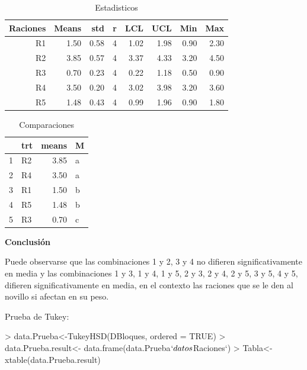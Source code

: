 \documentclass[12pt,letterpaper]{report}
\begin{document}
\begin{table}[ht]
\centering
\begin{tabular}{rrrrrrrr}
  \hline
  Raciones  & Means & std & r & LCL & UCL & Min & Max \\ 
  \hline
  R1 & 1.50 & 0.58 &   4 & 1.02 & 1.98 & 0.90 & 2.30 \\ 
  R2 & 3.85 & 0.57 &   4 & 3.37 & 4.33 & 3.20 & 4.50 \\ 
  R3 & 0.70 & 0.23 &   4 & 0.22 & 1.18 & 0.50 & 0.90 \\ 
  R4 & 3.50 & 0.20 &   4 & 3.02 & 3.98 & 3.20 & 3.60 \\ 
  R5 & 1.48 & 0.43 &   4 & 0.99 & 1.96 & 0.90 & 1.80 \\ 
   \hline
\end{tabular}
\caption{Estadisticos}
\end{table}

\begin{table}[ht]
\centering
\begin{tabular}{rlrl}
  \hline
  & trt & means & M \\ 
  \hline
  1 & R2 & 3.85 & a \\ 
  2 & R4 & 3.50 & a \\ 
  3 & R1 & 1.50 & b \\ 
  4 & R5 & 1.48 & b \\ 
  5 & R3 & 0.70 & c \\ 
   \hline
\end{tabular}
\caption{Comparaciones}
\end{table}
\newpage
\textbf{Conclusión}

Puede observarse que las combinaciones 1 y 2, 3 y 4 no difieren significativamente en media y las combinaciones 1 y 3, 1 y 4, 1 y 5, 2 y 3, 2 y 4, 2 y 5, 3 y 5, 4 y 5, difieren significativamente en media, en el contexto las raciones que se le den al novillo si afectan en su peso.  

Prueba de Tukey:
\begin{Schunk}
\begin{Sinput}
> data.Prueba<-TukeyHSD(DBloques, ordered = TRUE)
> data.Prueba.result<- data.frame(data.Prueba$`datos$Raciones`)
> Tabla<- xtable(data.Prueba.result)
\end{Sinput}
\end{Schunk}
\end{document}
